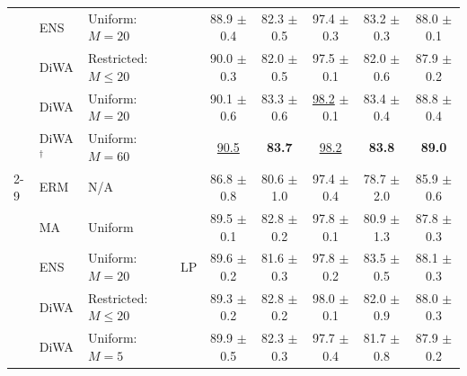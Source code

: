 \begin{table}[h]
{\begin{tabular}{llll|ccccc}
             & ENS                                                & Uniform: $M=20$           &                                                & 88.9 $\pm$ 0.4   & 82.3 $\pm$ 0.5   & 97.4 $\pm$ 0.3             & 83.2 $\pm$ 0.3 & 88.0 $\pm$ 0.1 \\
             & DiWA                                               & Restricted: $M \leq 20$   &                                                & 90.0 $\pm$ 0.3   & 82.0 $\pm$ 0.5   & 97.5 $\pm$ 0.1             & 82.0 $\pm$ 0.6 & 87.9 $\pm$ 0.2 \\
             & DiWA                                               & Uniform: $M=20$           &                                                & 90.1 $\pm$ 0.6   & 83.3 $\pm$ 0.6   & \underline{98.2} $\pm$ 0.1 & 83.4 $\pm$ 0.4 & 88.8 $\pm$ 0.4 \\
             & DiWA$^{\dagger}$                                   & Uniform: $M=60$           &                                                & \underline{90.5} & \textbf{83.7}    & \underline{98.2}           & \textbf{83.8}  & \textbf{89.0}  \\
            \cmidrule{2-9}
             & ERM                                                & N/A                       & \multirow{7}{*}{LP \cite{kumar2022finetuning}} & 86.8 $\pm$ 0.8   & 80.6 $\pm$ 1.0   & 97.4 $\pm$ 0.4             & 78.7 $\pm$ 2.0 & 85.9 $\pm$ 0.6 \\
             & MA \cite{arpit2021ensemble}                        & Uniform                   &                                                & 89.5 $\pm$ 0.1   & 82.8 $\pm$ 0.2   & 97.8 $\pm$ 0.1             & 80.9 $\pm$ 1.3 & 87.8 $\pm$ 0.3 \\
             & ENS                                                & Uniform: $M=20$           &                                                & 89.6 $\pm$ 0.2   & 81.6 $\pm$ 0.3   & 97.8 $\pm$ 0.2             & 83.5 $\pm$ 0.5 & 88.1 $\pm$ 0.3 \\
             & DiWA                                               & Restricted: $M \leq 20$   &                                                & 89.3 $\pm$ 0.2   & 82.8 $\pm$ 0.2   & 98.0 $\pm$ 0.1             & 82.0 $\pm$ 0.9 & 88.0 $\pm$ 0.3 \\
             & DiWA                                               & Uniform: $M=5$            &                                                & 89.9 $\pm$ 0.5   & 82.3 $\pm$ 0.3   & 97.7 $\pm$ 0.4             & 81.7 $\pm$ 0.8 & 87.9 $\pm$ 0.2 \\

\end{tabular}}
\end{table}
